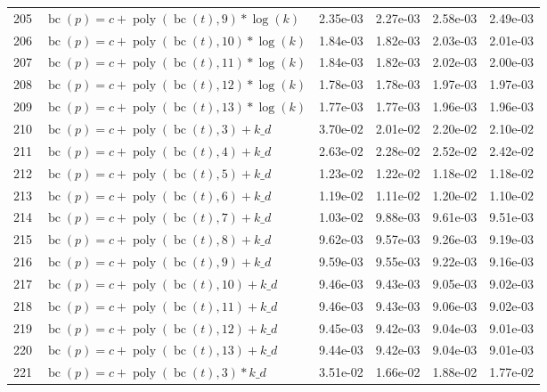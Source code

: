 \documentclass[12pt,a4paper]{article}
\DeclareMathOperator{\bc}{bc}
\DeclareMathOperator{\poly}{poly}
\begin{document}
\begin{longtable}[t]{ll>{\raggedleft\arraybackslash}p{2cm}>{\raggedleft\arraybackslash}p{2cm}>{\raggedleft\arraybackslash}p{2cm}>{\raggedleft\arraybackslash}p{2cm}}
\rowcolor{gray!6}  205 & $\bc(p) = c + \poly\left( \bc(t), 9 \right) * \log(k)$ & 2.35e-03 & 2.27e-03 & 2.58e-03 & 2.49e-03\\
206 & $\bc(p) = c + \poly\left( \bc(t), 10 \right) * \log(k)$ & 1.84e-03 & 1.82e-03 & 2.03e-03 & 2.01e-03\\
\rowcolor{gray!6}  207 & $\bc(p) = c + \poly\left( \bc(t), 11 \right) * \log(k)$ & 1.84e-03 & 1.82e-03 & 2.02e-03 & 2.00e-03\\
208 & $\bc(p) = c + \poly\left( \bc(t), 12 \right) * \log(k)$ & 1.78e-03 & 1.78e-03 & 1.97e-03 & 1.97e-03\\
\rowcolor{gray!6}  209 & $\bc(p) = c + \poly\left( \bc(t), 13 \right) * \log(k)$ & 1.77e-03 & 1.77e-03 & 1.96e-03 & 1.96e-03\\
210 & $\bc(p) = c + \poly\left( \bc(t), 3 \right) + k\_d$ & 3.70e-02 & 2.01e-02 & 2.20e-02 & 2.10e-02\\
\rowcolor{gray!6}  211 & $\bc(p) = c + \poly\left( \bc(t), 4 \right) + k\_d$ & 2.63e-02 & 2.28e-02 & 2.52e-02 & 2.42e-02\\
212 & $\bc(p) = c + \poly\left( \bc(t), 5 \right) + k\_d$ & 1.23e-02 & 1.22e-02 & 1.18e-02 & 1.18e-02\\
\rowcolor{gray!6}  213 & $\bc(p) = c + \poly\left( \bc(t), 6 \right) + k\_d$ & 1.19e-02 & 1.11e-02 & 1.20e-02 & 1.10e-02\\
214 & $\bc(p) = c + \poly\left( \bc(t), 7 \right) + k\_d$ & 1.03e-02 & 9.88e-03 & 9.61e-03 & 9.51e-03\\
\rowcolor{gray!6}  215 & $\bc(p) = c + \poly\left( \bc(t), 8 \right) + k\_d$ & 9.62e-03 & 9.57e-03 & 9.26e-03 & 9.19e-03\\
216 & $\bc(p) = c + \poly\left( \bc(t), 9 \right) + k\_d$ & 9.59e-03 & 9.55e-03 & 9.22e-03 & 9.16e-03\\
\rowcolor{gray!6}  217 & $\bc(p) = c + \poly\left( \bc(t), 10 \right) + k\_d$ & 9.46e-03 & 9.43e-03 & 9.05e-03 & 9.02e-03\\
218 & $\bc(p) = c + \poly\left( \bc(t), 11 \right) + k\_d$ & 9.46e-03 & 9.43e-03 & 9.06e-03 & 9.02e-03\\
\rowcolor{gray!6}  219 & $\bc(p) = c + \poly\left( \bc(t), 12 \right) + k\_d$ & 9.45e-03 & 9.42e-03 & 9.04e-03 & 9.01e-03\\
220 & $\bc(p) = c + \poly\left( \bc(t), 13 \right) + k\_d$ & 9.44e-03 & 9.42e-03 & 9.04e-03 & 9.01e-03\\
\rowcolor{gray!6}  221 & $\bc(p) = c + \poly\left( \bc(t), 3 \right) * k\_d$ & 3.51e-02 & 1.66e-02 & 1.88e-02 & 1.77e-02\\

\end{longtable}
\end{document}
